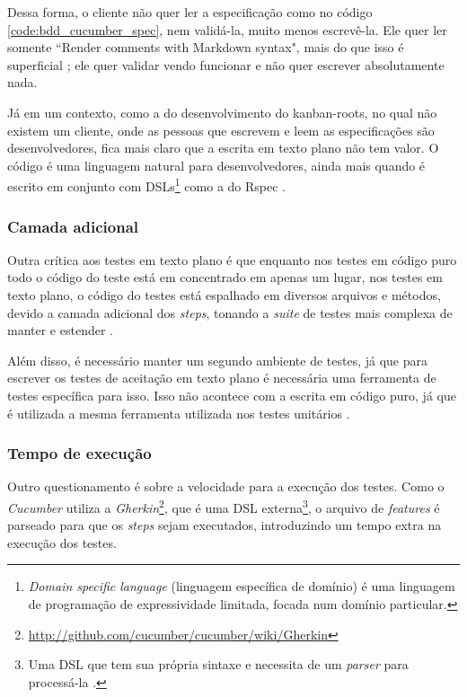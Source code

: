 Dessa forma, o cliente não quer ler a especificação como no código \ref{code:bdd_cucumber_spec}, nem validá-la, muito menos escrevê-la. Ele quer ler somente ``Render comments with Markdown syntax", mais do que isso é superficial \cite{WhyBotherWithCucumberTesting}; ele quer validar vendo funcionar e não quer escrever absolutamente nada.

Já em um contexto, como a do desenvolvimento do kanban-roots, no qual não existem um cliente, onde as pessoas que escrevem e leem as especificações são desenvolvedores, fica mais claro que a escrita em texto plano não tem valor. O código é uma linguagem natural para desenvolvedores, ainda mais quando é escrito em conjunto com DSLs\footnote{\textit{Domain specific language} (linguagem específica de domínio) é uma linguagem de programação de expressividade limitada, focada num domínio particular.} como a do Rspec \cite{SteakOverCucumber}.


\subsubsection{Camada adicional} %
\label{subsub:camada_adicional}

Outra crítica aos testes em texto plano é que enquanto nos testes em código puro todo o código do teste está em concentrado em apenas um lugar, nos testes em texto plano, o código do testes está espalhado em diversos arquivos e métodos, devido a camada adicional dos \textit{steps}, tonando a \textit{suite} de testes mais complexa de manter e estender \cite{SteakOverCucumber}.

Além disso, é necessário manter um segundo ambiente de testes, já que para escrever os testes de aceitação em texto plano é necessária uma ferramenta de testes específica para isso. Isso não acontece com a escrita em código puro, já que é utilizada a mesma ferramenta utilizada nos testes unitários \cite{WhyBotherWithCucumberTesting}.


\subsubsection{Tempo de execução} %
\label{subsub:tempo_de_execucao}

Outro questionamento é sobre a velocidade para a execução dos testes. Como o \textit{Cucumber} utiliza a \textit{Gherkin}\footnote{\url{http://github.com/cucumber/cucumber/wiki/Gherkin}}, que é uma DSL externa\footnote{Uma DSL que tem sua própria sintaxe e necessita de um \textit{parser} para processá-la \cite{DSLFowler}.}, o arquivo de \textit{features} é parseado para que os \textit{steps} sejam executados, introduzindo um tempo extra na execução dos testes.

